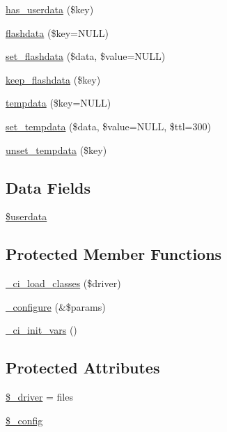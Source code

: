\begin{DoxyCompactItemize}
\hyperlink{class_c_i___session_a25f39652bb0f716817e5e1e778729bea}{has\+\_\+userdata} (\$key)
\item 
\hyperlink{class_c_i___session_acc27ddf9dd242d2c887eca2504136cff}{flashdata} (\$key=N\+U\+L\+L)
\item 
\hyperlink{class_c_i___session_a177029809f00f95b6a83cc137a45ff4e}{set\+\_\+flashdata} (\$data, \$value=N\+U\+L\+L)
\item 
\hyperlink{class_c_i___session_a1e25514ba8dbd132db06cbedc6412158}{keep\+\_\+flashdata} (\$key)
\item 
\hyperlink{class_c_i___session_a0bd79cb5948499f7c43adbe29f0c24a9}{tempdata} (\$key=N\+U\+L\+L)
\item 
\hyperlink{class_c_i___session_a51cac8d017a43882b365aa45745dc892}{set\+\_\+tempdata} (\$data, \$value=N\+U\+L\+L, \$ttl=300)
\item 
\hyperlink{class_c_i___session_a79d3115c19f6dfa873ca5f3a7929f24a}{unset\+\_\+tempdata} (\$key)
\end{DoxyCompactItemize}
\subsection*{Data Fields}
\begin{DoxyCompactItemize}
\item 
\hyperlink{class_c_i___session_af70e594e86a310311c717b13e6ecac00}{\$userdata}
\end{DoxyCompactItemize}
\subsection*{Protected Member Functions}
\begin{DoxyCompactItemize}
\item 
\hyperlink{class_c_i___session_ae4203f92a9f8a01d2498649f79acb0f9}{\+\_\+ci\+\_\+load\+\_\+classes} (\$driver)
\item 
\hyperlink{class_c_i___session_a71e7f49b0627505b4a7dbc8ce368279b}{\+\_\+configure} (\&\$params)
\item 
\hyperlink{class_c_i___session_a143bee24c36e5fd566b58bed89cd8463}{\+\_\+ci\+\_\+init\+\_\+vars} ()
\end{DoxyCompactItemize}
\subsection*{Protected Attributes}
\begin{DoxyCompactItemize}
\item 
\hyperlink{class_c_i___session_a538d24348271772aa61f8239cc6431dd}{\$\+\_\+driver} = \textquotesingle{}files\textquotesingle{}
\item 
\hyperlink{class_c_i___session_a4d4ad4af1600438042f93a4492f8dbbe}{\$\+\_\+config}
\end{DoxyCompactItemize}


